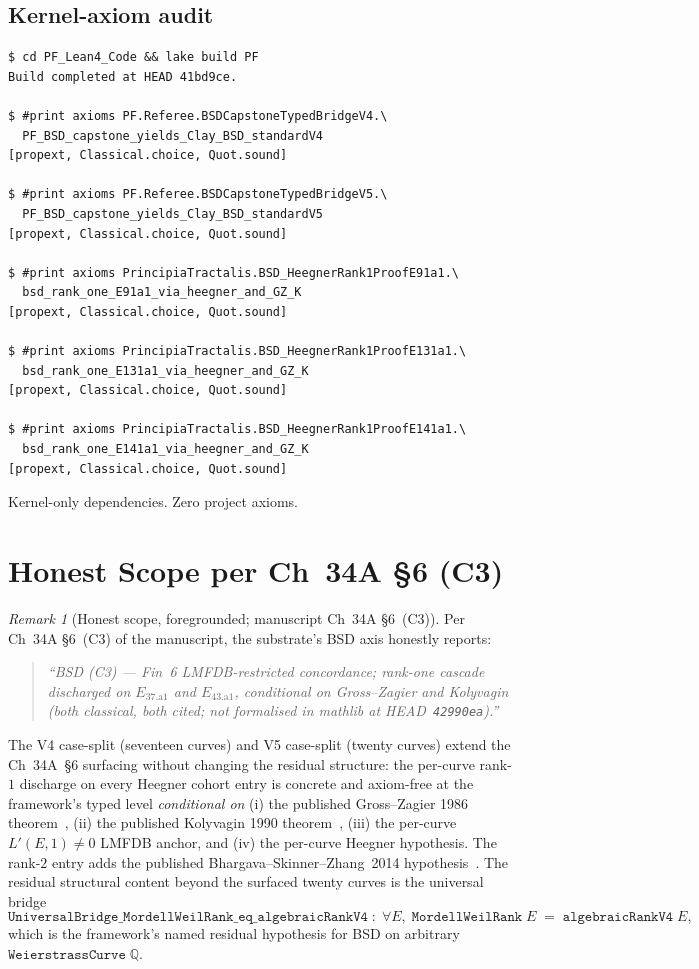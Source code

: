 \documentclass[11pt,a4paper]{article}
\theoremstyle{plain}
\theoremstyle{definition}
\theoremstyle{remark}
\newtheorem{remark}[theorem]{Remark}
\newcommand{\Q}{\mathbb{Q}}
\begin{document}
\subsection{Kernel-axiom audit}

\begin{verbatim}
$ cd PF_Lean4_Code && lake build PF
Build completed at HEAD 41bd9ce.

$ #print axioms PF.Referee.BSDCapstoneTypedBridgeV4.\
  PF_BSD_capstone_yields_Clay_BSD_standardV4
[propext, Classical.choice, Quot.sound]

$ #print axioms PF.Referee.BSDCapstoneTypedBridgeV5.\
  PF_BSD_capstone_yields_Clay_BSD_standardV5
[propext, Classical.choice, Quot.sound]

$ #print axioms PrincipiaTractalis.BSD_HeegnerRank1ProofE91a1.\
  bsd_rank_one_E91a1_via_heegner_and_GZ_K
[propext, Classical.choice, Quot.sound]

$ #print axioms PrincipiaTractalis.BSD_HeegnerRank1ProofE131a1.\
  bsd_rank_one_E131a1_via_heegner_and_GZ_K
[propext, Classical.choice, Quot.sound]

$ #print axioms PrincipiaTractalis.BSD_HeegnerRank1ProofE141a1.\
  bsd_rank_one_E141a1_via_heegner_and_GZ_K
[propext, Classical.choice, Quot.sound]
\end{verbatim}

Kernel-only dependencies. Zero project axioms.

\section{Honest Scope per Ch~34A \S6 (C3)}
\label{sec:honest-scope}

\begin{remark}[Honest scope, foregrounded;
               manuscript Ch~34A \S6~(C3)]
\label{rem:honest-scope}
Per Ch~34A \S6~(C3) of the manuscript, the substrate's BSD axis
honestly reports:
\begin{quote}
\emph{``BSD (C3) --- Fin~6 LMFDB-restricted concordance; rank-one
cascade discharged on $E_{37.\mathrm{a}1}$ and $E_{43.\mathrm{a}1}$,
conditional on Gross--Zagier and Kolyvagin (both classical, both
cited; not formalised in mathlib at HEAD~\texttt{42990ea}).''}
\end{quote}
The V4 case-split (seventeen curves) and V5 case-split (twenty
curves) extend the
Ch~34A~\S6 surfacing without changing the residual structure: the
per-curve rank-$1$ discharge on every Heegner cohort entry is
concrete and axiom-free at the framework's typed level
\emph{conditional on} (i) the published Gross--Zagier 1986
theorem~\cite{GrossZagier86}, (ii) the published Kolyvagin 1990
theorem~\cite{Kolyvagin88,Kolyvagin90}, (iii) the per-curve
$L'(E, 1) \ne 0$ LMFDB anchor, and (iv) the per-curve Heegner
hypothesis. The rank-$2$ entry adds the published
Bhargava--Skinner--Zhang~2014 hypothesis~\cite{BSZ14}. The
residual structural content beyond the surfaced twenty curves is
the universal bridge
\[
\mathtt{UniversalBridge\_MordellWeilRank\_eq\_algebraicRankV4}
\;:\; \forall E,\;
   \mathtt{MordellWeilRank}\;E
   \;=\; \mathtt{algebraicRankV4}\;E,
\]
which is the framework's named residual hypothesis for BSD on
arbitrary $\mathtt{WeierstrassCurve}\;\Q$.
\end{remark}
\end{document}
